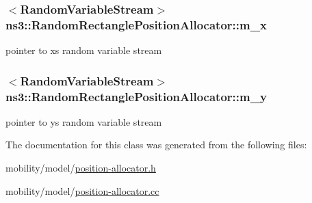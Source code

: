 \subsubsection[{\texorpdfstring{m\+\_\+x}{m_x}}]{$<${\bf Random\+Variable\+Stream}$>$ ns3\+::\+Random\+Rectangle\+Position\+Allocator\+::m\+\_\+x\hspace{0.3cm}{\ttfamily [private]}}\hypertarget{classns3_1_1RandomRectanglePositionAllocator_a5568bd1982e2e6fa9fbe63995302eef4}{}\label{classns3_1_1RandomRectanglePositionAllocator_a5568bd1982e2e6fa9fbe63995302eef4}


pointer to x\textquotesingle{}s random variable stream 

\subsubsection[{\texorpdfstring{m\+\_\+y}{m_y}}]{$<${\bf Random\+Variable\+Stream}$>$ ns3\+::\+Random\+Rectangle\+Position\+Allocator\+::m\+\_\+y\hspace{0.3cm}{\ttfamily [private]}}\hypertarget{classns3_1_1RandomRectanglePositionAllocator_a4a5f9782834fd1798ede42029427cbb0}{}\label{classns3_1_1RandomRectanglePositionAllocator_a4a5f9782834fd1798ede42029427cbb0}


pointer to y\textquotesingle{}s random variable stream 



The documentation for this class was generated from the following files\+:\begin{DoxyCompactItemize}
\item 
mobility/model/\hyperlink{position-allocator_8h}{position-\/allocator.\+h}\item 
mobility/model/\hyperlink{position-allocator_8cc}{position-\/allocator.\+cc}\end{DoxyCompactItemize}

